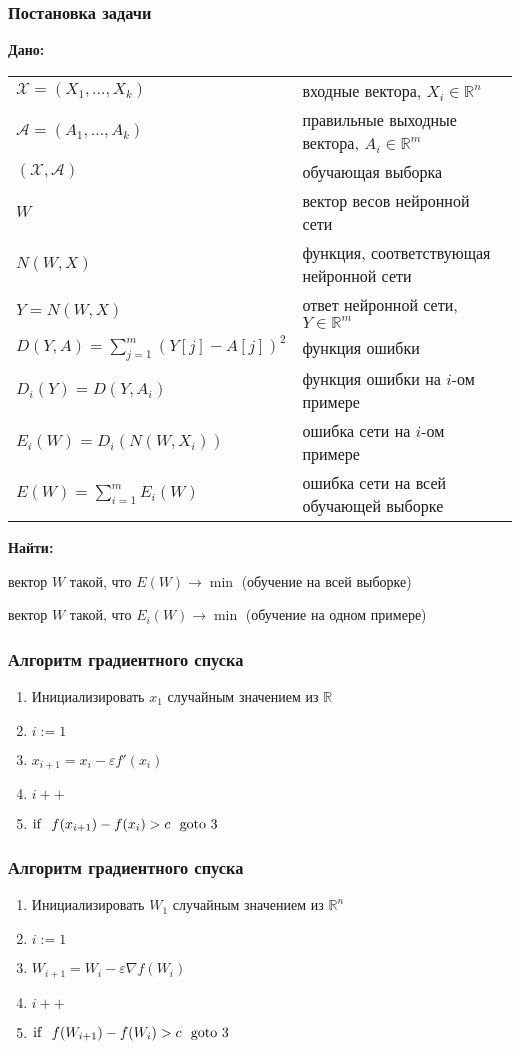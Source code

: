 \documentclass[24pt,pdf,hyperref={unicode},aspectratio=169]{beamer}
\begin{document}
\begin{frame}\frametitle{Постановка задачи}
{\bf Дано:}
\begin{tabular}{p{6cm} p{7.5cm}}
 $\mathcal{X}=(X_1,\ldots,X_k)$ & входные вектора, $X_i\in\mathbb{R}^n$\\[0.1cm]
 $\mathcal{A}=(A_1,\ldots,A_k)$ & правильные выходные вектора, $A_i\in\mathbb{R}^m$\\[0.1cm]
 $(\mathcal{X},\mathcal{A})$ & обучающая выборка  \\[0.1cm]
 $W$ & вектор весов нейронной сети \\[0.1cm]
 $N(W,X)$ & функция, соответствующая нейронной сети \\[0.1cm]
 $Y=N(W,X)$ & ответ нейронной сети, $Y\in\mathbb{R}^m$ \\[0.1cm]
 $D(Y,A) =\sum_{j=1}^{m} (Y[j]-A[j])^2$ & функция ошибки\\[0.1cm]
 $D_i(Y)=D(Y,A_i) $ & функция ошибки на $i$-ом примере \\[0.1cm]
  $E_i(W)=D_i(N(W,X_i))$ & ошибка сети на $i$-ом примере\\[0.1cm]
  $E(W)=\sum_{i=1}^{m}E_i(W) $ & ошибка сети на всей обучающей выборке \\[0.1cm]      
 \end{tabular}
{\bf Найти:}

вектор $W$ такой, что $E(W) \rightarrow \min$ (обучение на всей выборке)

вектор $W$ такой, что $E_i(W) \rightarrow \min$ (обучение на одном примере)

\end{frame}




\begin{frame}\frametitle{Алгоритм градиентного спуска}
\begin{enumerate}
 \item Инициализировать $x_1$ случайным значением из $\mathbb{R}$
 \item $i:=1$
 \item $x_{i+1}=x_i-\varepsilon f'(x_i)$
 \item $i++$
 \item ${\rm if}\ \ f(x_{i+1})-f(x_i) >c\ \ {\rm goto}\ 3$
\end{enumerate}
\end{frame}

\begin{frame}\frametitle{Алгоритм градиентного спуска}
\begin{enumerate}
 \item Инициализировать $W_1$ случайным значением из $\mathbb{R}^n$
 \item $i:=1$
 \item $W_{i+1}=W_i-\varepsilon \nabla f(W_i)$
 \item $i++$
 \item ${\rm if}\ \ f(W_{i+1})-f(W_i)>c\ \ {\rm goto}\ 3$
\end{enumerate}
\end{frame}
\end{document}
